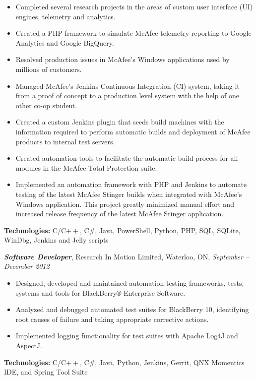 \documentclass[10pt,letterpaper]{article}
\newcommand{\job}[4]
{
    \emph{\textbf{#1}}, #2, #3, \emph{#4}
}
\begin{document}
\begin{adjustwidth}{0.1in}{0.5in}
    \begin{itemize}
	\item Completed several research projects in the areas of custom user interface (UI) engines, telemetry and analytics.
    \item Created a PHP framework to simulate McAfee telemetry reporting to Google Analytics and Google BigQuery.
	\item Resolved production issues in McAfee's Windows applications used by millions of customers.
	\item Managed McAfee's Jenkins Continuous Integration (CI) system, taking it from a proof of concept to a production level system with the help
	    of one other co-op student.
	\item Created a custom Jenkins plugin that seeds build machines with the information required to perform automatic builds and
	    deployment of McAfee products to internal test servers.
	\item Created automation tools to facilitate the automatic build process for all modules in the
	    McAfee Total Protection suite.
	\item Implemented an automation framework with PHP and Jenkins to automate testing of the latest McAfee Stinger builds when integrated
	    with McAfee's Windows application. This project greatly minimized manual effort and increased release frequency of the latest McAfee Stinger application.
    \end{itemize}
    \vspace{0.5em}
    \textbf{Technologies:} C/C$++$, C\#, Java, PowerShell, Python, PHP, SQL, SQLite, WinDbg, Jenkins and Jelly scripts
\end{adjustwidth}
\vspace{0.8em}
\job{Software Developer}{Research In Motion Limited}{Waterloo, ON}{September -- December 2012}\\
\begin{adjustwidth}{0.1in}{0.5in}
    \begin{itemize}
	\item Designed, developed and maintained automation testing frameworks, tests, systems and tools for
	    BlackBerry® Enterprise Software.
	\item Analyzed and debugged automated test suites for BlackBerry 10, identifying root causes of failure and
	    taking appropriate corrective actions.
	\item Implemented logging functionality for test suites with Apache Log4J and AspectJ.
    \end{itemize}
    \vspace{0.5em}
    \textbf{Technologies:} C/C$++$, C\#, Java, Python, Jenkins, Gerrit, QNX Momentics IDE, and Spring Tool Suite
\end{adjustwidth}
\end{document}
